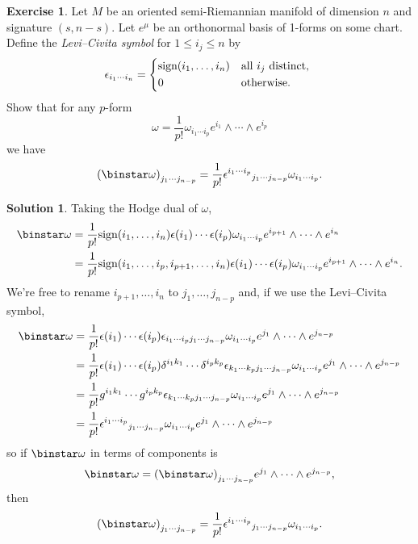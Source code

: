 \documentclass[11pt, a4paper]{report}
\theoremstyle{definition}
\newtheorem{exercise}{Exercise}[part]
\newtheorem{solution}{Solution}[part]
\newenvironment{ex}{\begin{exercise}}{\end{exercise}\pagebreak[1]}
\newenvironment{sol}{\begin{solution}}{\end{solution}\pagebreak[3]}
\renewcommand{\leq}{\leqslant}
\renewcommand*{\star}{\ensuremath\mathop{}\mathopen\binstar\mathord{}}
\begin{document}
\begin{ex}

Let $M$ be an oriented semi-Riemannian manifold of dimension $n$ and signature $(s, n - s)$. Let $e^\mu$ be an orthonormal basis of 1-forms on some chart. Define the \emph{Levi--Civita symbol} for $1 \leq i_j \leq n$ by
\[
    \epsilon_{i_1 \cdots i_n} = \begin{dcases*}
            \text{sign}(i_1, \ldots, i_n) & \text{all $i_j$ distinct}, \\
            0                             & otherwise.
        \end{dcases*}
\]
Show that for any $p$-form
\[
    \omega = \frac{1}{p!} \omega_{i_1 \cdots i_p} e^{i_1} \wedge \cdots \wedge e^{i_p}
\]
we have
\[
    {(\star \omega)}_{j_1 \cdots j_{n - p}} = \frac{1}{p!} {\epsilon^{i_1 \cdots i_p}}_{j_1 \cdots j_{n - p}} \omega_{i_1 \cdots i_p}.
\]

\end{ex}

\begin{sol}

Taking the Hodge dual of $\omega$,
\begin{align*}
    \star \omega &= \frac{1}{p!} \text{sign}(i_1, \ldots, i_n) \epsilon(i_1) \cdots \epsilon(i_p) \omega_{i_1 \cdots i_p} e^{i_{p + 1}} \wedge \cdots \wedge e^{i_n} \\
        &= \frac{1}{p!} \text{sign}(i_1, \ldots, i_p, i_{p + 1}, \ldots, i_n) \epsilon(i_1) \cdots \epsilon(i_p) \omega_{i_1 \cdots i_p} e^{i_{p + 1}} \wedge \cdots \wedge e^{i_n}.
\end{align*}
We're free to rename $i_{p + 1}, \ldots, i_n$ to $j_1, \ldots, j_{n - p}$ and, if we use the Levi--Civita symbol,
\begin{align*}
    \star \omega &= \frac{1}{p!} \epsilon(i_1) \cdots \epsilon(i_p) \epsilon_{i_1 \cdots i_p j_1 \cdots j_{n - p}} \omega_{i_1 \cdots i_p} e^{j_1} \wedge \cdots \wedge e^{j_{n - p}} \\
        &= \frac{1}{p!} \epsilon(i_1) \cdots \epsilon(i_p) \delta^{i_1 k_1} \cdots \delta^{i_p k_p} \epsilon_{k_1 \cdots k_p j_1 \cdots j_{n - p}} \omega_{i_1 \cdots i_p} e^{j_1} \wedge \cdots \wedge e^{j_{n - p}} \\
        &= \frac{1}{p!} g^{i_1 k_1} \cdots g^{i_p k_p} \epsilon_{k_1 \cdots k_p j_1 \cdots j_{n - p}} \omega_{i_1 \cdots i_p} e^{j_1} \wedge \cdots \wedge e^{j_{n - p}} \\
        &= \frac{1}{p!} {\epsilon^{i_1 \cdots i_p}}_{j_1 \cdots j_{n - p}} \omega_{i_1 \cdots i_p} e^{j_1} \wedge \cdots \wedge e^{j_{n - p}}
\end{align*}
so if $\star \omega$ in terms of components is
\[
    \star \omega = {(\star \omega)}_{j_1 \cdots j_{n - p}} e^{j_1} \wedge \cdots \wedge e^{j_{n - p}},
\]
then
\[
    {(\star \omega)}_{j_1 \cdots j_{n - p}} = \frac{1}{p!} {\epsilon^{i_1 \cdots i_p}}_{j_1 \cdots j_{n - p}} \omega_{i_1 \cdots i_p}.
\]

\end{sol}
\end{document}
